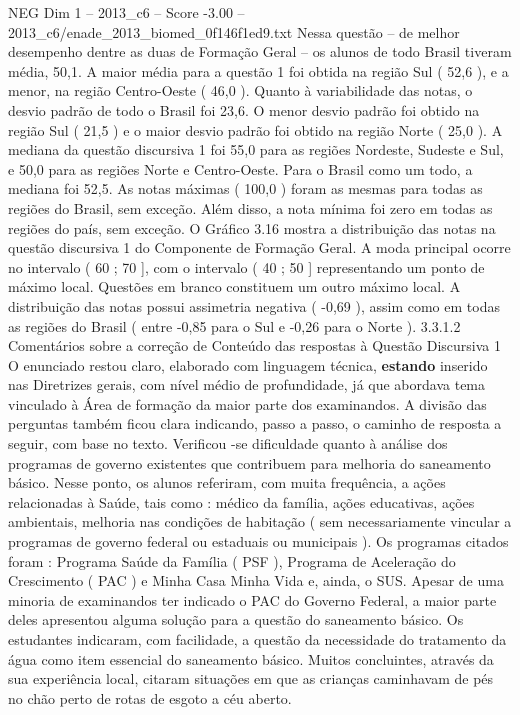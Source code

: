 \begin{textsample}{NEG Dim 1 – 2013\_c6 – Score -3.00 – 2013\_c6/enade\_2013\_biomed\_0f146f1ed9.txt}
Nessa questão – de melhor desempenho dentre as duas de Formação Geral – os alunos de todo Brasil tiveram média, 50,1.
A maior média para a questão 1 foi obtida na região Sul ( 52,6 ), e a menor, na região Centro-Oeste ( 46,0 ).
Quanto à variabilidade das notas, o desvio padrão de todo o Brasil foi 23,6.
O menor desvio padrão foi obtido na região Sul ( 21,5 ) e o maior desvio padrão foi obtido na região Norte ( 25,0 ).
A mediana da questão discursiva 1 foi 55,0 para as regiões Nordeste, Sudeste e Sul, e 50,0 para as regiões Norte e Centro-Oeste.
Para o Brasil como um todo, a mediana foi 52,5.
As notas máximas ( 100,0 ) foram as mesmas para todas as regiões do Brasil, sem exceção.
Além disso, a nota mínima foi zero em todas as regiões do país, sem exceção.
O Gráfico 3.16 mostra a distribuição das notas na questão discursiva 1 do Componente de Formação Geral.
A moda principal ocorre no intervalo ( 60 ; 70 ], com o intervalo ( 40 ; 50 ] representando um ponto de máximo local.
Questões em branco constituem um outro máximo local.
A distribuição das notas possui assimetria negativa ( -0,69 ), assim como em todas as regiões do Brasil ( entre -0,85 para o Sul e -0,26 para o Norte ). 3.3.1.2 Comentários sobre a correção de Conteúdo das respostas à Questão Discursiva 1 O enunciado restou claro, elaborado com linguagem técnica, \textbf{estando} inserido nas Diretrizes gerais, com nível médio de profundidade, já que abordava tema vinculado à Área de formação da maior parte dos examinandos.
A divisão das perguntas também ficou clara indicando, passo a passo, o caminho de resposta a seguir, com base no texto.
Verificou -se dificuldade quanto à análise dos programas de governo existentes que contribuem para melhoria do saneamento básico.
Nesse ponto, os alunos referiram, com muita frequência, a ações relacionadas à Saúde, tais como : médico da família, ações educativas, ações ambientais, melhoria nas condições de habitação ( sem necessariamente vincular a programas de governo federal ou estaduais ou municipais ).
Os programas citados foram : Programa Saúde da Família ( PSF ), Programa de Aceleração do Crescimento ( PAC ) e Minha Casa Minha Vida e, ainda, o SUS.
Apesar de uma minoria de examinandos ter indicado o PAC do Governo Federal, a maior parte deles apresentou alguma solução para a questão do saneamento básico.
Os estudantes indicaram, com facilidade, a questão da necessidade do tratamento da água como item essencial do saneamento básico.
Muitos concluintes, através da sua experiência local, citaram situações em que as crianças caminhavam de pés no chão perto de rotas de esgoto a céu aberto.

\end{textsample}
